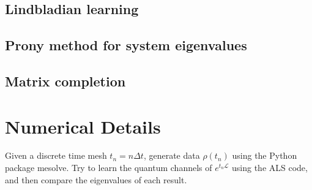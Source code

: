 \documentclass[10pt]{article}  %
\theoremstyle{plain}
\numberwithin{equation}{section}
\def\mL{\mathcal{L}}
\begin{document}
\subsection{Lindbladian learning}
\subsection{Prony method for system eigenvalues}
\subsection{Matrix completion}


\section{Numerical Details}

Given a discrete time mesh $t_n = n \Delta t$, generate data $\rho(t_n)$ using the Python package mesolve. Try to learn the quantum channels of $e^{t_n\mL}$ using the ALS code, and then compare the eigenvalues of each result.






























\printbibliography
\end{document}
